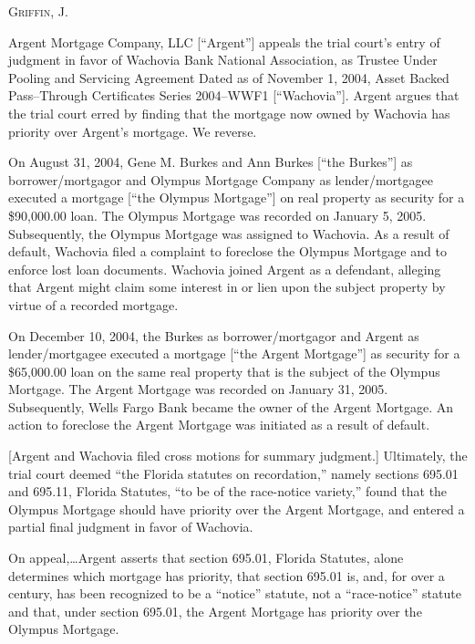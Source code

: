 
\opinion \textsc{Griffin}, J.

Argent Mortgage Company, LLC [``Argent''] appeals the trial court's entry of
judgment in favor of Wachovia Bank National Association, as Trustee Under
Pooling and Servicing Agreement Dated as of November 1, 2004, Asset Backed
Pass--Through Certificates Series 2004--WWF1 [``Wachovia'']. Argent argues that
the trial court erred by finding that the mortgage now owned by Wachovia has
priority over Argent's mortgage. We reverse.

On August 31, 2004, Gene M. Burkes and Ann Burkes [``the Burkes''] as
borrower/mortgagor and Olympus Mortgage Company as lender/mortgagee executed a
mortgage [``the Olympus Mortgage''] on real property as security for a
\$90,000.00 loan. The Olympus Mortgage was recorded on January 5, 2005.
Subsequently, the Olympus Mortgage was assigned to Wachovia. As a result of
default, Wachovia filed a complaint to foreclose the Olympus Mortgage and to
enforce lost loan documents. Wachovia joined Argent as a defendant, alleging
that Argent might claim some interest in or lien upon the subject property by
virtue of a recorded mortgage.

On December 10, 2004, the Burkes as borrower/mortgagor and Argent as
lender/mortgagee executed a mortgage [``the Argent Mortgage''] as security for
a \$65,000.00 loan on the same real property that is the subject of the Olympus
Mortgage. The Argent Mortgage was recorded on January 31, 2005. Subsequently,
Wells Fargo Bank became the owner of the Argent Mortgage. An action to
foreclose the Argent Mortgage was initiated as a result of default.

[Argent and Wachovia filed cross motions for summary judgment.] Ultimately, the
trial court deemed ``the Florida statutes on recordation,'' namely sections
695.01 and 695.11, Florida Statutes, ``to be of the race-notice variety,''
found that the Olympus Mortgage should have priority over the Argent Mortgage,
and entered a partial final judgment in favor of Wachovia.

On appeal,\ldots Argent asserts that section 695.01, Florida Statutes, alone
determines which mortgage has priority, that section 695.01 is, and, for over a
century, has been recognized to be a ``notice'' statute, not a ``race-notice''
statute and that, under section 695.01, the Argent Mortgage has priority over
the Olympus Mortgage.

